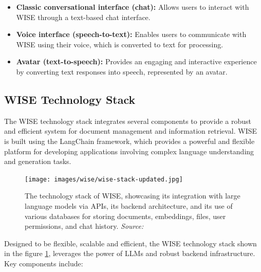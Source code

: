 \begin{itemize}
    \item \textbf{Classic conversational interface (chat):} Allows users to interact with WISE through a text-based chat interface.
    \item \textbf{Voice interface (speech-to-text):} Enables users to communicate with WISE using their voice, which is converted to text for processing.
    \item \textbf{Avatar (text-to-speech):} Provides an engaging and interactive experience by converting text responses into speech, represented by an avatar.
\end{itemize}

\subsection{WISE Technology Stack}

The WISE technology stack integrates several components to provide a robust and efficient system for document management and information retrieval. WISE is built using the LangChain \cite{langchain2024} framework, which provides a powerful and flexible platform for developing applications involving complex language understanding and generation tasks.

\begin{figure}[h!]
    \centering
    \texttt{[image: images/wise/wise-stack-updated.jpg]}
    \caption{The technology stack of WISE, showcasing its integration with large language models via APIs, its backend architecture, and its use of various databases for storing documents, embeddings, files, user permissions, and chat history. \textit{Source:} \cite{hpa2024}}
    \label{fig:wise-stack}
\end{figure}

Designed to be flexible, scalable and efficient, the WISE technology stack shown in the figure \ref{fig:wise-stack}, leverages the power of LLMs and robust backend infrastructure. Key components include:

